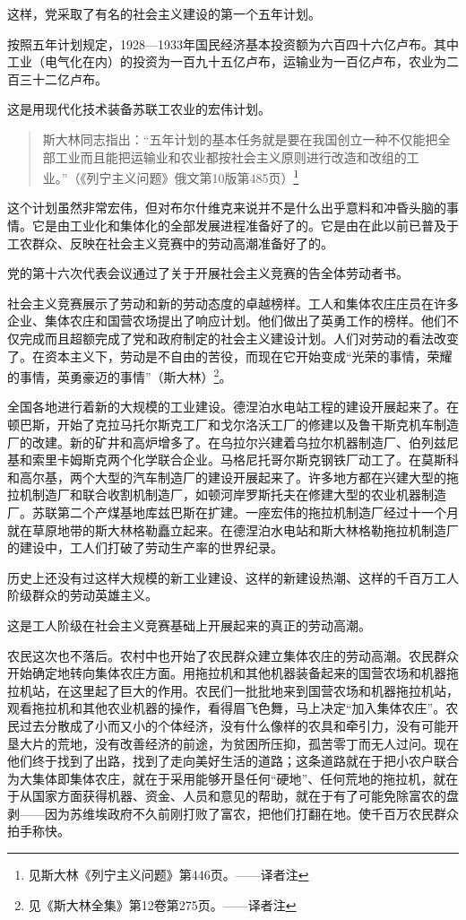 这样，党采取了有名的社会主义建设的第一个五年计划。

按照五年计划规定，1928—1933年国民经济基本投资额为六百四十六亿卢布。其中工业（电气化在内）的投资为一百九十五亿卢布，运输业为一百亿卢布，农业为二百三十二亿卢布。

这是用现代化技术装备苏联工农业的宏伟计划。

\begin{quotation}
斯大林同志指出：“五年计划的基本任务就是要在我国创立一种不仅能把全部工业而且能把运输业和农业都按社会主义原则进行改造和改组的工业。”（《列宁主义问题》俄文第10版第485页）\footnote{见斯大林《列宁主义问题》第446页。——译者注}
\end{quotation}

这个计划虽然非常宏伟，但对布尔什维克来说并不是什么出乎意料和冲昏头脑的事情。它是由工业化和集体化的全部发展进程准备好了的。它是由在此以前已普及于工农群众、反映在社会主义竞赛中的劳动高潮准备好了的。

党的第十六次代表会议通过了关于开展社会主义竞赛的告全体劳动者书。

社会主义竞赛展示了劳动和新的劳动态度的卓越榜样。工人和集体农庄庄员在许多企业、集体农庄和国营农场提出了响应计划。他们做出了英勇工作的榜样。他们不仅完成而且超额完成了党和政府制定的社会主义建设计划。人们对劳动的看法改变了。在资本主义下，劳动是不自由的苦役，而现在它开始变成“光荣的事情，荣耀的事情，英勇豪迈的事情”（斯大林）\footnote{见《斯大林全集》第12卷第275页。——译者注}。

全国各地进行着新的大规模的工业建设。德涅泊水电站工程的建设开展起来了。在顿巴斯，开始了克拉马托尔斯克工厂和戈尔洛沃工厂的修建以及鲁干斯克机车制造厂的改建。新的矿井和高炉增多了。在乌拉尔兴建着乌拉尔机器制造厂、伯列兹尼基和索里卡姆斯克两个化学联合企业。马格尼托哥尔斯克钢铁厂动工了。在莫斯科和高尔基，两个大型的汽车制造厂的建设开展起来了。许多地方都在兴建大型的拖拉机制造厂和联合收割机制造厂，如顿河岸罗斯托夫在修建大型的农业机器制造厂。苏联第二个产煤基地库兹巴斯在扩建。一座宏伟的拖拉机制造厂经过十一个月就在草原地带的斯大林格勒矗立起来。在德涅泊水电站和斯大林格勒拖拉机制造厂的建设中，工人们打破了劳动生产率的世界纪录。

历史上还没有过这样大规模的新工业建设、这样的新建设热潮、这样的千百万工人阶级群众的劳动英雄主义。

这是工人阶级在社会主义竞赛基础上开展起来的真正的劳动高潮。

农民这次也不落后。农村中也开始了农民群众建立集体农庄的劳动高潮。农民群众开始确定地转向集体农庄方面。用拖拉机和其他机器装备起来的国营农场和机器拖拉机站，在这里起了巨大的作用。农民们一批批地来到国营农场和机器拖拉机站，观看拖拉机和其他农业机器的操作，看得眉飞色舞，马上决定“加入集体农庄”。农民过去分散成了小而又小的个体经济，没有什么像样的农具和牵引力，没有可能开垦大片的荒地，没有改善经济的前途，为贫困所压抑，孤苦零丁而无人过问。现在他们终于找到了出路，找到了走向美好生活的道路；这条道路就在于把小农户联合为大集体即集体农庄，就在于采用能够开垦任何“硬地”、任何荒地的拖拉机，就在于从国家方面获得机器、资金、人员和意见的帮助，就在于有了可能免除富农的盘剥——因为苏维埃政府不久前刚打败了富农，把他们打翻在地。使千百万农民群众拍手称快。

